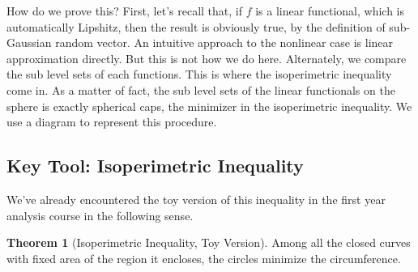 \documentclass[9pt,onesided]{article}
\newcommand{\mc}{\color{BlueViolet}}
\renewcommand{\ge}{\geqslant}
\theoremstyle{definition}
\newtheorem{theorem}{\mc Theorem}
\begin{document}
How do we prove this? First, let's recall that, if $f$ is a linear functional, which is automatically Lipshitz, then the result is obviously true, by the definition of sub-Gaussian random vector. An intuitive approach to the nonlinear case is linear approximation directly. But this is not how we do here. Alternately, we compare the sub level sets of each functions. This is where the isoperimetric inequality come in. As a matter of fact, the sub level sets of the linear functionals on the sphere is exactly spherical caps, the minimizer in the isoperimetric inequality. We use a diagram to represent this procedure.

{\begin{center}
\end{center}
}

\subsection{Key Tool: Isoperimetric Inequality}

We've already encountered the toy version of this inequality in the first year analysis course in the following sense.

\begin{theorem}
[Isoperimetric Inequality, Toy Version] Among all the closed curves with fixed area of the region it encloses, the circles minimize the circumference.
\end{theorem}
\end{document}
